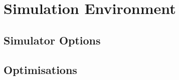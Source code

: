 \chapter{Simulation Environment}\label{simulation}

    \section{Simulator Options}\label{simulation_simulator_options}

    \section{Optimisations}\label{simulation_optimisations}

